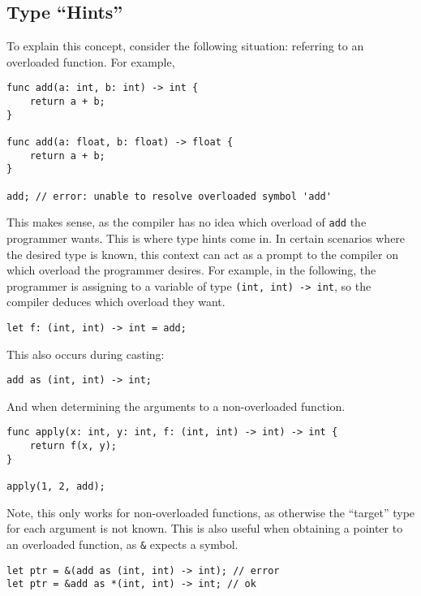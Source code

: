 \subsection{Type ``Hints''}\label{subsec:type-hints}

To explain this concept, consider the following situation: referring to an overloaded function.
For example,

\begin{lstlisting}[language=CustomLang]
func add(a: int, b: int) -> int {
    return a + b;
}

func add(a: float, b: float) -> float {
    return a + b;
}

add; // error: unable to resolve overloaded symbol 'add'
\end{lstlisting}

This makes sense, as the compiler has no idea which overload of \texttt{add} the programmer wants.
This is where type hints come in.
In certain scenarios where the desired type is known, this context can act as a prompt to the compiler on which overload the programmer desires.
For example, in the following, the programmer is assigning to a variable of type \texttt{(int, int) -> int}, so the compiler deduces which overload they want.

\begin{lstlisting}[language=CustomLang]
let f: (int, int) -> int = add;
\end{lstlisting}

This also occurs during casting:

\begin{lstlisting}[language=CustomLang]
add as (int, int) -> int;
\end{lstlisting}

And when determining the arguments to a non-overloaded function.

\begin{lstlisting}[language=CustomLang]
func apply(x: int, y: int, f: (int, int) -> int) -> int {
    return f(x, y);
}

apply(1, 2, add);
\end{lstlisting}

Note, this only works for non-overloaded functions, as otherwise the ``target'' type for each argument is not known.
This is also useful when obtaining a pointer to an overloaded function, as \texttt{\&} expects a symbol.

\begin{lstlisting}[language=CustomLang]
let ptr = &(add as (int, int) -> int); // error
let ptr = &add as *(int, int) -> int; // ok
\end{lstlisting}
